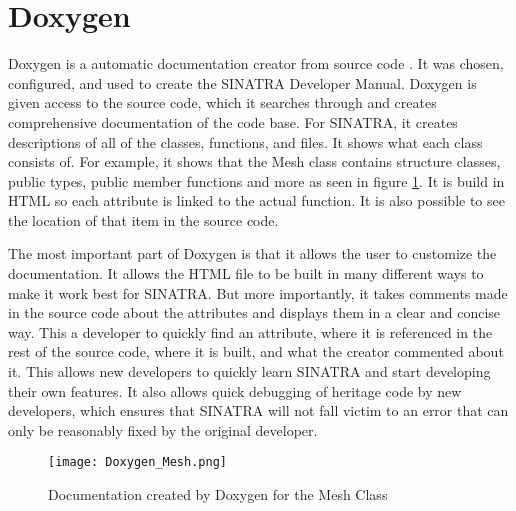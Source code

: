 \section{Doxygen}
Doxygen is a automatic documentation creator from source code \cite{doxygen}. It was chosen, configured, and used to create the SINATRA Developer Manual. Doxygen is given access to the source code, which it searches through and creates comprehensive documentation of the code base. For SINATRA, it creates descriptions of all of the classes, functions, and files. It shows what each class consists of. For example, it shows that the Mesh class contains structure classes, public types, public member functions and more as seen in figure \ref{fig:Doxygen_Mesh}. It is build in HTML so each attribute is linked to the actual function. It is also possible to see the location of that item in the source code. \par
\indent The most important part of Doxygen is that it allows the user to customize the documentation. It allows the HTML file to be built in many different ways to make it work best for SINATRA. But more importantly, it takes comments made in the source code about the attributes and displays them in a clear and concise way. This a developer to quickly find an attribute, where it is referenced in the rest of the source code, where it is built, and what the creator commented about it. This allows new developers to quickly learn SINATRA and start developing their own features. It also allows quick debugging of heritage code by new developers, which ensures that SINATRA will not fall victim to an error that can only be reasonably fixed by the original developer. 


\begin{figure}
\texttt{[image: Doxygen\_Mesh.png]}
\centering
  \caption{Documentation created by Doxygen for the Mesh Class}
  \label{fig:Doxygen_Mesh}
\end{figure}




